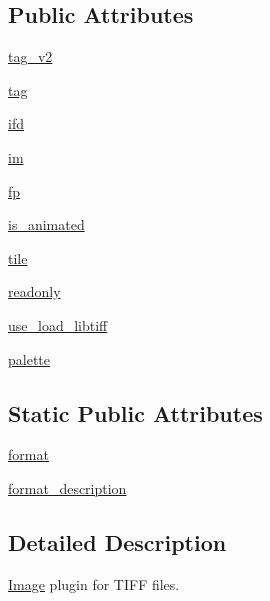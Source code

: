 \subsection*{Public Attributes}
\begin{DoxyCompactItemize}
\item 
\hyperlink{classPIL_1_1TiffImagePlugin_1_1TiffImageFile_a497040ded8ed30a00a682cabcd85ab3f}{tag\+\_\+v2}
\item 
\hyperlink{classPIL_1_1TiffImagePlugin_1_1TiffImageFile_a01c47968713cd7e0d2855b3b4f732a4a}{tag}
\item 
\hyperlink{classPIL_1_1TiffImagePlugin_1_1TiffImageFile_a79ffa98e72758bca4cd830de3b412260}{ifd}
\item 
\hyperlink{classPIL_1_1TiffImagePlugin_1_1TiffImageFile_adf71f5620eae26e349f536d1b2f655a2}{im}
\item 
\hyperlink{classPIL_1_1TiffImagePlugin_1_1TiffImageFile_a3945776f2dceba14e5c0430cf9e44a46}{fp}
\item 
\hyperlink{classPIL_1_1TiffImagePlugin_1_1TiffImageFile_ac8f9529494eec867100f4385213d2537}{is\+\_\+animated}
\item 
\hyperlink{classPIL_1_1TiffImagePlugin_1_1TiffImageFile_af8a49aaceb0c8ba3bbffdf615572b96e}{tile}
\item 
\hyperlink{classPIL_1_1TiffImagePlugin_1_1TiffImageFile_a3cda6e980d7bc96d5983d1af0b32926e}{readonly}
\item 
\hyperlink{classPIL_1_1TiffImagePlugin_1_1TiffImageFile_a5d101d5f0d51a92f564047b977deb034}{use\+\_\+load\+\_\+libtiff}
\item 
\hyperlink{classPIL_1_1TiffImagePlugin_1_1TiffImageFile_ae82b5e161fad6634328d79c85a05da7e}{palette}
\end{DoxyCompactItemize}
\subsection*{Static Public Attributes}
\begin{DoxyCompactItemize}
\item 
\hyperlink{classPIL_1_1TiffImagePlugin_1_1TiffImageFile_a96b913f3a62e8aa1c605261b30ffb124}{format}
\item 
\hyperlink{classPIL_1_1TiffImagePlugin_1_1TiffImageFile_a73fbd0cad186eb55881969c3c7b22659}{format\+\_\+description}
\end{DoxyCompactItemize}


\subsection{Detailed Description}
\hyperlink{namespacePIL_1_1Image}{Image} plugin for T\+I\+FF files. 



